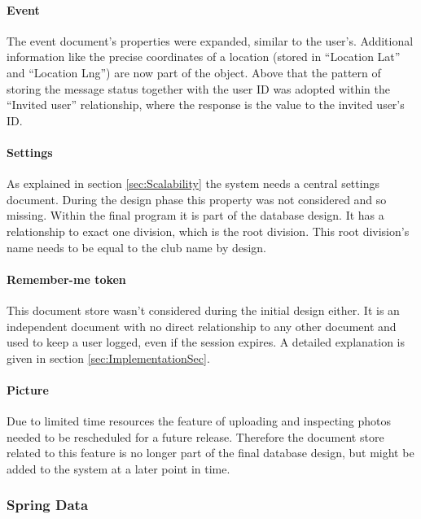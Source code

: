 \paragraph{Event}

The event document's properties were expanded, similar to the user's. Additional information like the precise coordinates of a location (stored in \enquote{Location Lat} and \enquote{Location Lng}) are now part of the object. Above that the pattern of storing the message status together with the user ID was adopted within the \enquote{Invited user} relationship, where the response is the value to the invited user's ID.

\paragraph{Settings}

As explained in section \vref{sec:Scalability} the system needs a central settings document. During the design phase this property was not considered and so missing. Within the final program it is part of the database design. It has a relationship to exact one division, which is the root division. This root division's name needs to be equal to the club name by design. 

\paragraph{Remember-me token}

This document store wasn't considered during the initial design either. It is an independent document with no direct relationship to any other document and used to keep a user logged, even if the session expires. A detailed explanation is given in section \vref{sec:ImplementationSec}. 

\paragraph{Picture}

Due to limited time resources the feature of uploading and inspecting photos needed to be rescheduled for a future release. Therefore the document store related to this feature is no longer part of the final database design, but might be added to the system at a later point in time.

\subsubsection{Spring Data}

